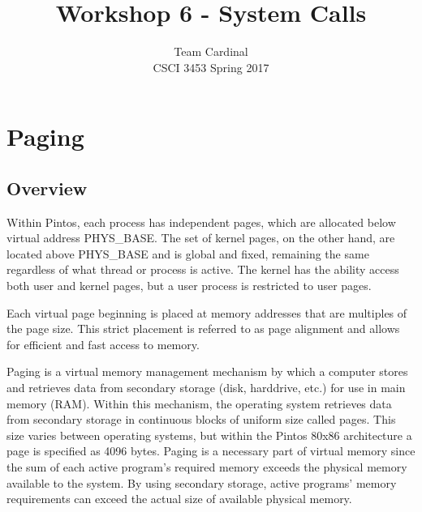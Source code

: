 \documentclass[11pt, letterpaper]{article}
\begin{document}

\title{Workshop 6 - System Calls}
\author{Team Cardinal\\CSCI 3453 Spring 2017}
\maketitle




\section{Paging}

\subsection{Overview}
Within Pintos, each process has independent pages, which are allocated below virtual address PHYS\_BASE. The set of kernel pages, on the other hand, are located above PHYS\_BASE and is global and fixed, remaining the  same regardless of what thread or process is active. The kernel has the ability access both user and   kernel pages, but a user process is restricted to user pages.
   
Each virtual page beginning is placed at memory addresses  that are multiples of the page size. This strict placement is referred to as  page alignment and allows for efficient and fast access to memory. 

Paging is a virtual memory management mechanism by which a computer stores and retrieves data from secondary storage (disk, harddrive, etc.) for use in main memory (RAM).  Within this mechanism,  the operating system retrieves data from secondary storage in continuous blocks of uniform size called pages. This size varies between operating systems, but within the Pintos 80x86 architecture a page is specified as 4096 bytes.   Paging is a necessary part of virtual memory  since the sum of each active program’s required memory exceeds the physical memory available to the system. By using secondary storage, active programs’ memory requirements can exceed the actual size of available physical memory.
\end{document}
